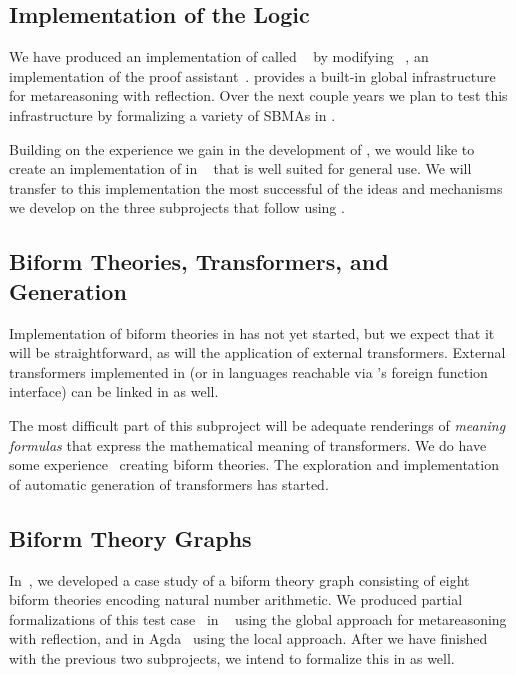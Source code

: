 \documentclass[fleqn]{llncs}
\begin{document}
\subsection*{Implementation of the Logic}

We have produced an implementation of {\churchqe} called
{\HLQE}~\cite{CaretteFarmerLaskowski18} by modifying
{\HL}~\cite{Harrison09}, an implementation of the {\HOL} proof
assistant~\cite{GordonMelham93}.  {\HLQE} provides a built-in global
infrastructure for metareasoning with reflection.  Over the next
couple years we plan to test this infrastructure by formalizing a
variety of SBMAs in {\HLQE}.

Building on the experience we gain in the development of {\HLQE}, we
would like to create an implementation of {\churchqe} in
{\MMT}~\cite{RabeKohlhase13} that is well suited for general use.  We
will transfer to this {\MMT} implementation the most successful of the
ideas and mechanisms we develop on the three subprojects that follow
using {\HLQE}.

\subsection*{Biform Theories, Transformers, and Generation}

Implementation of biform theories in {\HLQE} has not yet started, but
we expect that it will be straightforward, as will the application of
external transformers.  External transformers implemented in {\OCAML}
(or in languages reachable via {\OCAML}'s foreign function interface)
can be linked in as well.

The most difficult part of this subproject will be adequate renderings
of \emph{meaning formulas} that express the mathematical meaning of
transformers. We do have some
experience~\cite{CaretteFarmer17,CaretteFarmerSorge07} creating biform
theories.  The exploration and implementation of automatic generation
of transformers has started.

\subsection*{Biform Theory Graphs}

In~\cite{CaretteFarmer17}, we developed a case study of a biform
theory graph consisting of eight biform theories encoding natural number
arithmetic.  We produced partial formalizations of this test
case~\cite{CaretteFarmer17} in {\churchuqe}~\cite{Farmer17} using the
global approach for metareasoning with reflection, and in
Agda~\cite{Norell07,Norell09} using the local approach.  After we have
finished with the previous two subprojects, we intend to formalize this
in {\HLQE} as well.
\end{document}
